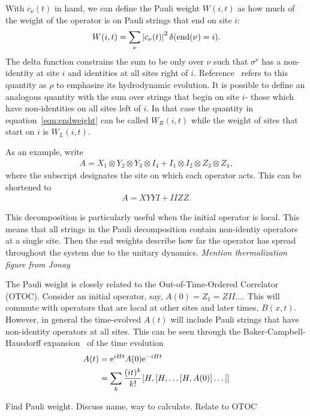 With $c_\nu(t)$ in hand, we can define the Pauli weight $W(i,t)$ as how much of the weight of the operator is on Pauli strings that end on site $i$:
\begin{align}
W(i,t) = \sum_\nu\left|c_\nu(t)\right|^2\delta(\text{end}(\nu)=i).
	\label{eqn:endweight}
\end{align}
The delta function constrains the sum to be only over $\nu$ such that $\sigma^\nu$ has a non-identity at site $i$ and identities at all sites right of $i$. Reference~\cite{Keyserlingk} refers to this quantity as $\rho$ to emphasize its hydrodynamic evolution. It is possible to define an analogous quantity with the sum over strings that begin on site $i$- those which have non-identities on all sites left of $i$. In that case the quantity in equation~\ref{eqn:endweight} can be called $W_R(i,t)$ while the weight of sites that start on $i$ is $W_L(i,t)$.

As an example, write
\begin{align}
A = X_1\otimes Y_2\otimes Y_3\otimes I_4 + I_1\otimes I_2\otimes Z_3\otimes Z_4,
	\nonumber
\end{align}
where the subscript designates the site on which each operator acts. This can be shortened to
\begin{align}
A = XYYI + IIZZ\label{eqn:inioper}.
\end{align}

This decomposition is particularly useful when the initial operator is local. This means that all strings in the Pauli decomposition contain non-identiy operators at a single site. Then the end weights describe how far the operator has spread throughout the system due to the unitary dynamics. \emph{Mention thermalization} \emph{figure from Jonay}

The Pauli weight is closely related to the Out-of-Time-Ordered Correlator (OTOC). Consider an initial operator, say, $A(0)=Z_1=ZII\dots$. This will commute with operators that are local at other sites and later times, $B(x,t)$. However, in general the time-evolved $A(t)$ will include Pauli strings that have non-identity operators at all sites. This can be seen through the Baker-Campbell-Hausdorff expansion~\cite{Roberts2016} of the time evolution
\begin{align}
A(t) &= \text{e}^{iHt}A(0)\text{e}^{-iHt} \nonumber\\
&= \sum_k\frac{(it)^k}{k!}[H,[H,\dots[H,A(0)]\dots]]
\end{align}

Find Pauli weight. Discuss name, way to calculate. Relate to OTOC

